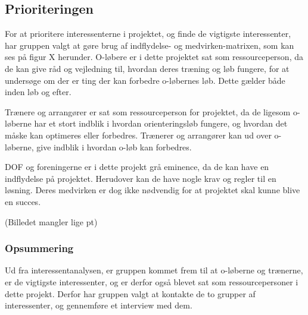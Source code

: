 \subsection{Prioriteringen}
For at prioritere interessenterne i projektet, og finde de vigtigste interessenter, har gruppen valgt at gøre brug af indflydelse- og medvirken-matrixen, som kan ses på figur X herunder.  
O-løbere er i dette projektet sat som ressourceperson, da de kan give råd og vejledning til, hvordan deres træning og løb fungere, for at undersøge om der er ting der kan forbedre o-løbernes løb. Dette gælder både inden løb og efter.

Trænere og arrangører er sat som ressourceperson for projektet, da de ligesom o-løberne har et stort indblik i hvordan orienteringsløb fungere, og hvordan det måske kan optimeres eller forbedres. Trænerer og arrangører kan ud over o-løberne, give indblik i hvordan o-løb kan forbedres.  

DOF og foreningerne er i dette projekt grå eminence, da de kan have en indflydelse på projektet. Herudover kan de have nogle krav og regler til en løsning. Deres medvirken er dog ikke nødvendig for at projektet skal kunne blive en succes.   


(Billedet mangler lige pt)



\subsubsection{Opsummering}
Ud fra interessentanalysen, er gruppen kommet frem til at o-løberne og trænerne, er de vigtigste interessenter, og er derfor også blevet sat som ressourcepersoner i dette projekt. Derfor har gruppen valgt at kontakte de to grupper af interessenter, og gennemføre et interview med dem. 
